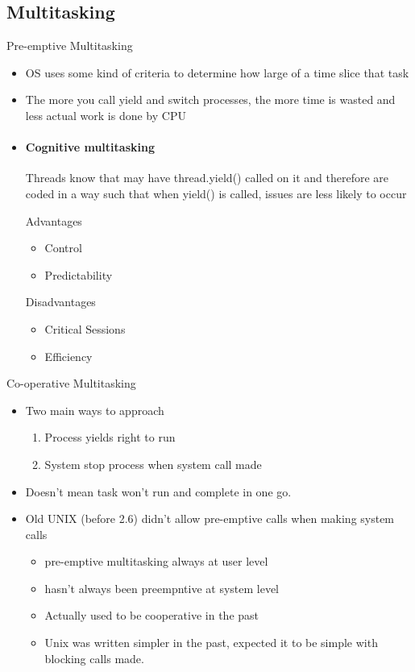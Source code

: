 \documentclass{article}
\begin{document}
	\subsection{Multitasking}
		Pre-emptive Multitasking
		\begin{itemize}
			\item OS uses some kind of criteria to determine how large of a time slice that task
			\item The more you call yield and switch processes, the more time is wasted and less actual work is done by CPU
			\item \paragraph{Cognitive multitasking}
				
			Threads know that may have thread.yield() called on it and therefore are coded in a way such that when yield() is called, issues are less likely to occur
			
			Advantages
				\begin{itemize}
					\item Control
					\item Predictability
				\end{itemize}
			
			Disadvantages
				\begin{itemize}
					\item Critical Sessions
					\item Efficiency
				\end{itemize}
		\end{itemize}
		Co-operative Multitasking
		\begin{itemize}
			\item Two main ways to approach
			\begin{enumerate}
				\item Process yields right to run
				\item System stop process when system call made
			\end{enumerate}

			\item Doesn't mean task won't run and complete in one go.
			\item Old UNIX (before 2.6) didn't allow pre-emptive calls when making system calls
			\begin{itemize}
				\item pre-emptive multitasking always at user level
				\item hasn't always been preempntive at system level
				\item Actually used to be cooperative in the past
				\item Unix was written simpler in the past, expected it to be simple with blocking calls made.
			\end{itemize}
		\end{itemize}
		
\end{document}
